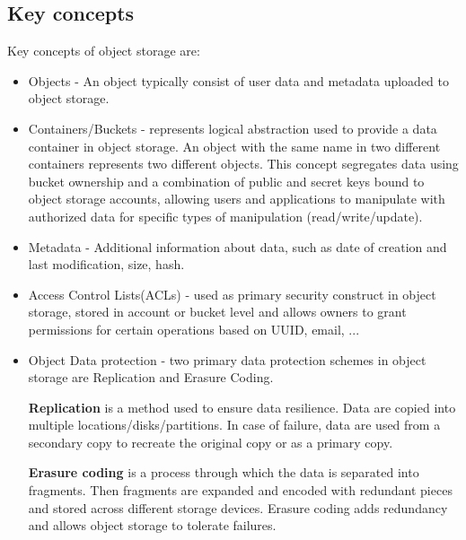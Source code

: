     \subsection{Key concepts}
    Key concepts of object storage are\cite{ibmObjectStorage}:
    \begin{itemize}
        \item Objects - An object typically consist of user data and metadata uploaded to object storage.
        \item Containers/Buckets - represents logical abstraction used to provide a data container in object storage. An object with the same name in two different containers represents two different objects. This concept segregates data using bucket ownership and a combination of public and secret keys bound to object storage accounts, allowing users and applications to manipulate with authorized data for specific types of manipulation (read/write/update).
        \item Metadata - Additional information about data, such as date of creation and last modification, size, hash.
        \item Access Control Lists(ACLs) - used as primary security construct in object storage, stored in account or bucket level and allows owners to grant permissions for certain operations based on UUID, email, ...
        \item Object Data protection - two primary data protection schemes in object storage are Replication and Erasure Coding.

        \textbf{Replication} is a method used to ensure data resilience. Data are copied into multiple locations/disks/partitions. In case of failure, data are used from a secondary copy to recreate the original copy or as a primary copy.

        \textbf{Erasure coding} is a process through which the data is separated into fragments. Then fragments are expanded and encoded with redundant pieces and stored across different storage devices. Erasure coding adds redundancy and allows object storage to tolerate failures.
    \end{itemize}


